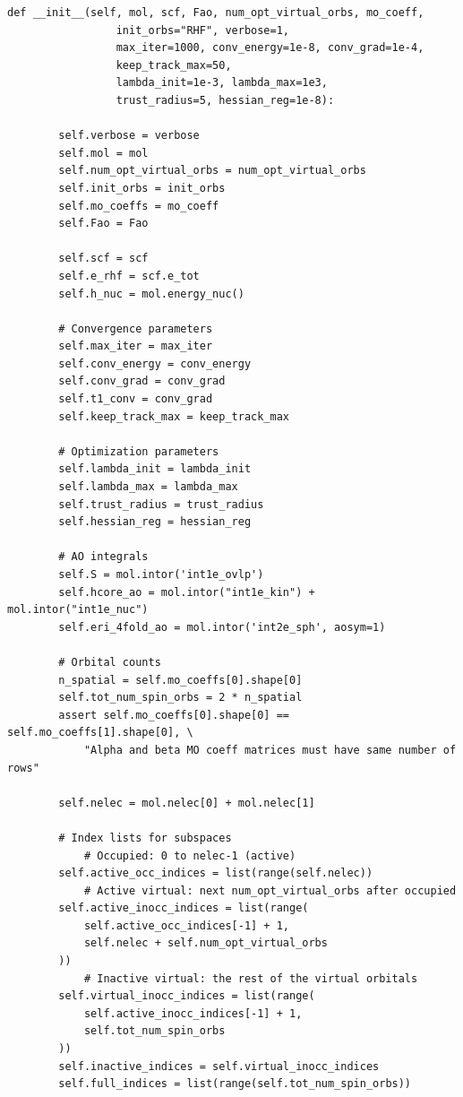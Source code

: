 \begin{lstlisting}[style=python, caption={...}, label=lst:full_code]
    def __init__(self, mol, scf, Fao, num_opt_virtual_orbs, mo_coeff,
                 init_orbs="RHF", verbose=1,
                 max_iter=1000, conv_energy=1e-8, conv_grad=1e-4,
                 keep_track_max=50,
                 lambda_init=1e-3, lambda_max=1e3,
                 trust_radius=5, hessian_reg=1e-8):

        self.verbose = verbose
        self.mol = mol
        self.num_opt_virtual_orbs = num_opt_virtual_orbs
        self.init_orbs = init_orbs
        self.mo_coeffs = mo_coeff
        self.Fao = Fao

        self.scf = scf
        self.e_rhf = scf.e_tot
        self.h_nuc = mol.energy_nuc()

        # Convergence parameters
        self.max_iter = max_iter
        self.conv_energy = conv_energy
        self.conv_grad = conv_grad
        self.t1_conv = conv_grad
        self.keep_track_max = keep_track_max

        # Optimization parameters
        self.lambda_init = lambda_init
        self.lambda_max = lambda_max
        self.trust_radius = trust_radius
        self.hessian_reg = hessian_reg

        # AO integrals
        self.S = mol.intor('int1e_ovlp')
        self.hcore_ao = mol.intor("int1e_kin") + mol.intor("int1e_nuc")
        self.eri_4fold_ao = mol.intor('int2e_sph', aosym=1)

        # Orbital counts
        n_spatial = self.mo_coeffs[0].shape[0]
        self.tot_num_spin_orbs = 2 * n_spatial
        assert self.mo_coeffs[0].shape[0] == self.mo_coeffs[1].shape[0], \
            "Alpha and beta MO coeff matrices must have same number of rows"

        self.nelec = mol.nelec[0] + mol.nelec[1]

        # Index lists for subspaces
            # Occupied: 0 to nelec-1 (active)
        self.active_occ_indices = list(range(self.nelec))
            # Active virtual: next num_opt_virtual_orbs after occupied
        self.active_inocc_indices = list(range(
            self.active_occ_indices[-1] + 1,
            self.nelec + self.num_opt_virtual_orbs
        ))
            # Inactive virtual: the rest of the virtual orbitals
        self.virtual_inocc_indices = list(range(
            self.active_inocc_indices[-1] + 1,
            self.tot_num_spin_orbs
        ))
        self.inactive_indices = self.virtual_inocc_indices
        self.full_indices = list(range(self.tot_num_spin_orbs))


\end{lstlisting}
